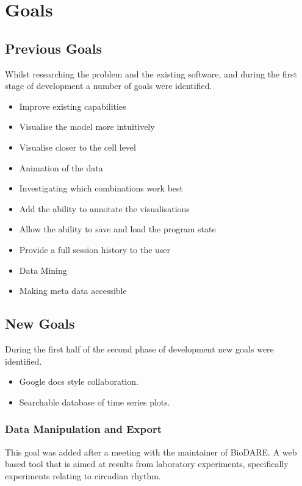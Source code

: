 \section{Goals}

\subsection{Previous Goals}
Whilst researching the problem and the existing software, and during the first stage of development a number of goals were identified.

\begin{itemize}
\item Improve existing capabilities
\item Visualise the model more intuitively
\item Visualise closer to the cell level
\item Animation of the data
\item Investigating which combinations work best
\item Add the ability to annotate the visualisations
\item Allow the ability to save and load the program state
\item Provide a full session history to the user
\item Data Mining
\item Making meta data accessible
\end{itemize}

\subsection{New Goals}
During the first half of the second phase of development new goals were identified.

\begin{itemize}
\item Google docs style collaboration.
\item Searchable database of time series plots.
\end{itemize}

\subsubsection{Data Manipulation and Export}

This goal was added after a meeting with the maintainer of BioDARE.  A web based tool that is aimed at results from laboratory experiments, specifically experiments relating to circadian rhythm.

